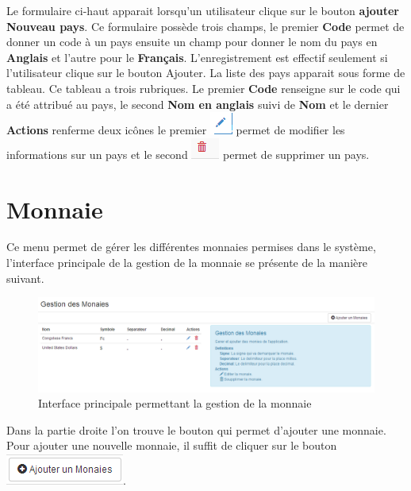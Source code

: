 \documentclass[12pt,a4paper]{report}
\begin{document}
Le formulaire ci-haut apparait lorsqu'un utilisateur clique sur le bouton \textbf{ajouter Nouveau pays}. Ce formulaire possède trois champs, le premier \textbf{Code} permet de donner un code à un pays ensuite un champ pour donner le nom du pays en \textbf{Anglais} et l'autre pour le \textbf{Français}.
L'enregistrement est effectif seulement si l'utilisateur clique sur le bouton Ajouter. La liste des pays apparait sous forme de tableau. Ce tableau a trois rubriques. Le premier \textbf{Code} renseigne sur le code qui a été attribué au pays, le second \textbf{Nom en anglais} suivi de \textbf{Nom}  et le dernier \textbf{Actions} renferme deux icônes le premier \includegraphics[scale=0.7]{pic/EditUser.png}  permet de modifier les informations sur un pays et le second \includegraphics[scale=0.7]{pic/DeleteWRed.png}  permet de supprimer un pays.


\newpage
\section{Monnaie}
Ce menu permet de gérer les différentes monnaies permises dans le système, l'interface principale de la gestion de la monnaie se présente de la manière suivant.

\begin{figure}[h]
\begin{center}
\includegraphics[width=16cm]{pic/AdminCurrency.png}
\end{center}
\caption{Interface principale permettant la gestion de la monnaie}
\label{Interface principale permettant la gestion de la monnaie}
\end{figure}

Dans la partie droite l'on trouve le bouton qui permet d'ajouter une monnaie. Pour ajouter une nouvelle monnaie, il suffit de cliquer sur le bouton \includegraphics[scale=0.7]{pic/AddMonney.png}.
\end{document}
